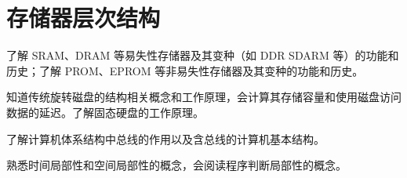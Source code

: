 \chapter{存储器层次结构}
    \begin{summary}
        \begin{compactitem}
            \item 了解 SRAM、DRAM 等易失性存储器及其变种（如 DDR SDARM 等）的功能和历史；了解 PROM、EPROM 等非易失性存储器及其变种的功能和历史。
            \item 知道传统旋转磁盘的结构相关概念和工作原理，会计算其存储容量和使用磁盘访问数据的延迟。了解固态硬盘的工作原理。
            \item 了解计算机体系结构中总线的作用以及含总线的计算机基本结构。
            \item 熟悉时间局部性和空间局部性的概念，会阅读程序判断局部性的概念。
        \end{compactitem}
    \end{summary}

